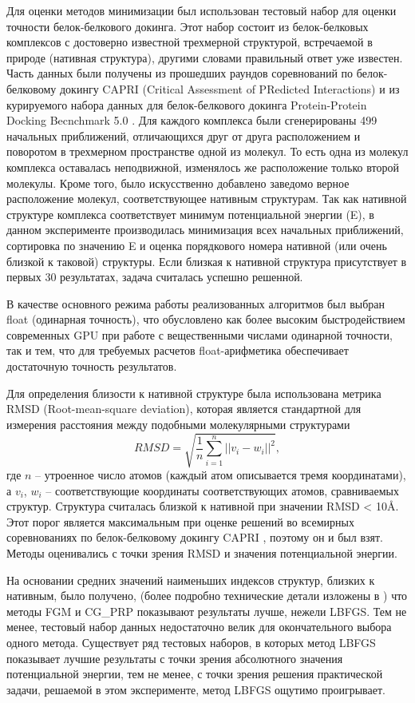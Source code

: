   Для оценки методов минимизации был использован тестовый набор для оценки точности белок-белкового докинга. Этот набор состоит из белок-белковых комплексов с достоверно известной трехмерной структурой, встречаемой в природе (нативная структура), другими словами правильный ответ уже известен. Часть данных были получены из прошедших раундов соревнований по белок-белковому докингу CAPRI (Critical Assessment of PRedicted Interactions) \cite{janin2002welcome} и из курируемого набора данных для белок-белкового докинга Protein-Protein Docking Becnchmark 5.0 \cite{vreven2015updates}. Для каждого комплекса были сгенерированы 499 начальных приближений, отличающихся друг от друга расположением и поворотом в трехмерном пространстве одной из молекул. То есть одна из молекул комплекса оставалась неподвижной, изменялось же расположение только второй молекулы. Кроме того, было искусственно добавлено заведомо верное расположение молекул, соответствующее нативным структурам. Так как нативной структуре комплекса соответствует минимум потенциальной энергии (E), в данном эксперименте производилась минимизация всех начальных приближений, сортировка по значению E и оценка порядкового номера нативной (или очень близкой к таковой) структуры. Если близкая к нативной структура присутствует в первых 30 результатах, задача считалась успешно решенной.

  В качестве основного режима работы реализованных алгоритмов был выбран float (одинарная точность), что обусловлено как более высоким быстродействием современных GPU при работе с вещественными числами одинарной точности, так и тем, что для требуемых расчетов float-арифметика обеспечивает достаточную точность результатов.

  Для определения близости к нативной структуре была использована метрика RMSD (Root-mean-square deviation), которая является стандартной для измерения расстояния между подобными молекулярными структурами 
  \[
  RMSD = \sqrt{\frac{1}{n}\sum_{i=1}^n ||v_i - w_i||^2},
  \]
  где $n$ -- утроенное число атомов (каждый атом описывается тремя координатами), а $v_i$, $w_i$ -- соответствующие координаты соответствующих атомов, сравниваемых структур.
  Структура считалась близкой к нативной при значении RMSD < 10Å. Этот порог является максимальным при оценке решений во всемирных соревнованиях по белок-белковому докингу CAPRI \cite{janin2002welcome}, поэтому он и был взят. Методы оценивались с точки зрения RMSD и значения потенциальной энергии.

  На основании средних значений наименьших индексов структур, близких к нативным, было получено, (более подробно технические детали изложены в \cite{yakovlev2019algorithms}) что методы FGM и CG\_PRP показывают результаты лучше, нежели LBFGS. Тем не менее, тестовый набор данных недостаточно велик для окончательного выбора одного метода. Существует ряд тестовых наборов, в которых метод LBFGS показывает лучшие результаты с точки зрения абсолютного значения потенциальной энергии, тем не менее, с точки зрения решения практической задачи, решаемой в этом эксперименте, метод LBFGS ощутимо проигрывает.

